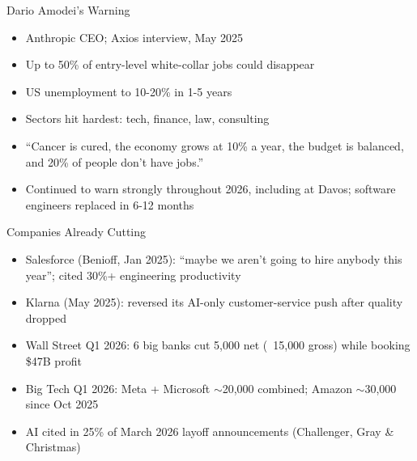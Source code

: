 \documentclass[aspectratio=169]{beamer}
\begin{document}
\begin{frame}{Dario Amodei's Warning}
    \begin{itemize}
        \item Anthropic CEO; Axios interview, May 2025
        \vspace{0.3em}
        \item Up to 50\% of entry-level white-collar jobs could disappear
        \vspace{0.3em}
        \item US unemployment to 10-20\% in 1-5 years
        \vspace{0.3em}
        \item Sectors hit hardest: tech, finance, law, consulting
        \vspace{0.3em}
        \item ``Cancer is cured, the economy grows at 10\% a year, the budget is balanced, and 20\% of people don't have jobs.''
        \vspace{0.3em}
        \item Continued to warn strongly throughout 2026, including at Davos; software engineers replaced in 6-12 months
    \end{itemize}
\end{frame}

\begin{frame}{Companies Already Cutting}
    \begin{itemize}
        \item Salesforce (Benioff, Jan 2025): ``maybe we aren't going to hire anybody this year''; cited 30\%+ engineering productivity
        \vspace{0.3em}
        \item Klarna (May 2025): reversed its AI-only customer-service push after quality dropped
        \vspace{0.3em}
        \item Wall Street Q1 2026: 6 big banks cut 5{,}000 net (~15{,}000 gross) while booking \$47B profit
        \vspace{0.3em}
        \item Big Tech Q1 2026: Meta + Microsoft $\sim$20{,}000 combined; Amazon $\sim$30{,}000 since Oct 2025
        \vspace{0.3em}
        \item AI cited in 25\% of March 2026 layoff announcements (Challenger, Gray \& Christmas)
    \end{itemize}
\end{frame}
\end{document}
